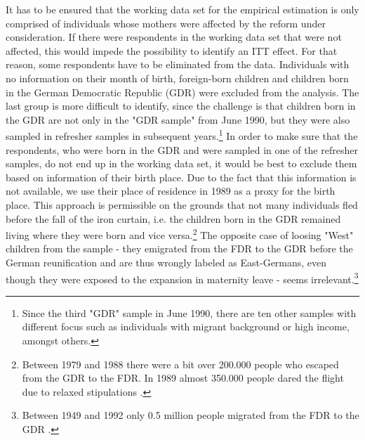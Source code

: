 \documentclass[a4paper ]{article}
\begin{document}
It has to be ensured that the working data set for the empirical estimation is only comprised of individuals whose mothers were affected by the reform under consideration. If there were respondents in the working data set that were not affected, this would impede the possibility to identify an ITT effect. For that reason, some respondents have to be eliminated from the data. \newline 
Individuals with no information on their month of birth, foreign-born children and children born in the German Democratic Republic (GDR) were excluded from the analysis. The last group is more difficult to identify, since the challenge is that children born in the GDR are not only in the "GDR sample" from June 1990, but they were also sampled in refresher samples in subsequent years.\footnote{Since the third "GDR" sample in June 1990, there are ten other samples with different focus such as individuals with migrant background or high income, amongst others.} In order to make sure that the respondents, who were born in the GDR and were sampled in one of the refresher samples, do not end up in the working data set, it would be best to exclude them based on information of their birth place. Due to the fact that this information is not available, we use their place of residence in 1989 as a proxy for the birth place. This approach is permissible on the grounds that not many individuals fled before the fall of the iron curtain, i.e. the children born in the GDR remained living where they were born and vice versa.\footnote{Between 1979 and 1988 there were a bit over 200.000 people who escaped from the GDR to the FDR. In 1989 almost 350.000 people dared the flight due to relaxed stipulations \citep{mayer2002flucht}.} The opposite case of loosing "West" children from the sample - they emigrated from the FDR to the GDR before the German reunification and are thus wrongly labeled as East-Germans, even though they were exposed to the expansion in maternity leave - seems irrelevant.\footnote{Between 1949 and 1992 only 0.5 million people migrated from the FDR to the GDR \citep{klusmeyer2009immigration, fassmann1994european}.}\newline
\end{document}
